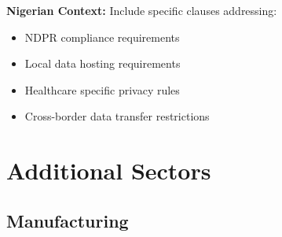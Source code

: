 \begin{tcolorbox}[colback=white,colframe=primarydark,title=\textbf{Patient Data Documentation}]
\textbf{Nigerian Context:}
Include specific clauses addressing:
\begin{itemize}
    \item NDPR compliance requirements
    \item Local data hosting requirements
    \item Healthcare specific privacy rules
    \item Cross-border data transfer restrictions
\end{itemize}
\end{tcolorbox}

\section{Additional Sectors}

\subsection{Manufacturing}
